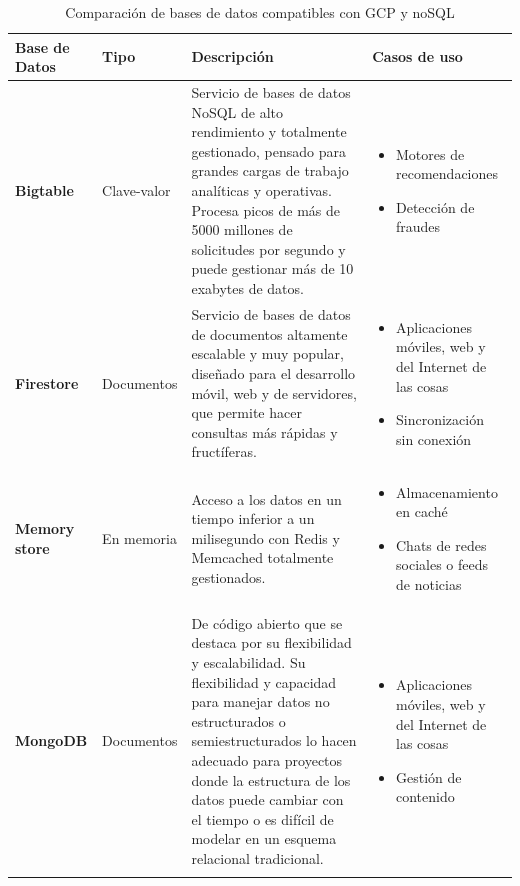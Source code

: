 \begin{longtable}{|m{2.2cm}|m{2.2cm}|m{6cm}|m{3cm}|}
\hline
\textbf{Base de Datos} & \textbf{Tipo} & \textbf{Descripción} & \textbf{Casos de uso}\\
\hline
\textbf
{Bigtable} & 
Clave-valor &
Servicio de bases de datos NoSQL de alto rendimiento y totalmente gestionado, pensado para grandes cargas de trabajo analíticas y operativas. Procesa picos de más de 5000 millones de solicitudes por segundo y puede gestionar más de 10 exabytes de datos. &  
\begin{itemize}[label={}, leftmargin=0pt]
    \item Motores de recomendaciones
    \item Detección de fraudes
\end{itemize}\\
\hline
\textbf
{Firestore} & 
Documentos &
Servicio de bases de datos de documentos altamente escalable y muy popular, diseñado para el desarrollo móvil, web y de servidores, que permite hacer consultas más rápidas y fructíferas. & 
\begin{itemize}[label={}, leftmargin=0pt]
    \item Aplicaciones móviles, web y del Internet de las cosas
    \item Sincronización sin conexión
\end{itemize}\\
\hline
\textbf
{Memory store} &
En memoria &
Acceso a los datos en un tiempo inferior a un milisegundo con Redis y Memcached totalmente gestionados. &
\begin{itemize}[label={}, leftmargin=0pt]
    \item Almacenamiento en caché
    \item Chats de redes sociales o feeds de noticias
\end{itemize}\\
\hline
\textbf
{MongoDB} &
Documentos &
De código abierto que se destaca por su flexibilidad y escalabilidad. Su flexibilidad y capacidad para manejar datos no estructurados o semiestructurados lo hacen adecuado para proyectos donde la estructura de los datos puede cambiar con el tiempo o es difícil de modelar en un esquema relacional tradicional. &
\begin{itemize}[label={}, leftmargin=0pt]
    \item Aplicaciones móviles, web y del Internet de las cosas
    \item Gestión de contenido
\end{itemize}\\
\hline
\hline
\caption{Comparación de bases de datos compatibles con GCP y noSQL}
\label{tab:comparacion_bases_datos}
\end{longtable}
